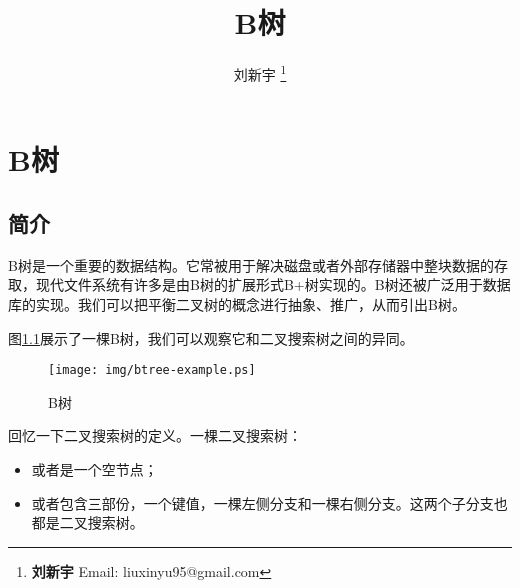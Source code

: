 \documentclass{ctexart}
\begin{document}


\title{B树}

\author{刘新宇
\thanks{{\bfseries 刘新宇 } \newline
  Email: liuxinyu95@gmail.com \newline}
  }

\maketitle
\fi


\ifx\wholebook\relax
\chapter{B树}
\fi


\section{简介}
\label{introduction}

B树是一个重要的数据结构。它常被用于解决磁盘或者外部存储器中整块数据的存取\cite{CLRS}，现代文件系统有许多是由B树的扩展形式B+树实现的。B树还被广泛用于数据库的实现。我们可以把平衡二叉树的概念进行抽象、推广，从而引出B树\cite{wiki-b-tree}。

图\ref{fig:btree-example}展示了一棵B树，我们可以观察它和二叉搜索树之间的异同。

\begin{figure}[htbp]
   \begin{center}
	\texttt{[image: img/btree-example.ps]}
   \caption{B树} \label{fig:btree-example}
   \end{center}
\end{figure}

回忆一下二叉搜索树的定义。一棵二叉搜索树：
\begin{itemize}
\item 或者是一个空节点；
\item 或者包含三部份，一个键值，一棵左侧分支和一棵右侧分支。这两个子分支也都是二叉搜索树。
\end{itemize}
\end{document}
